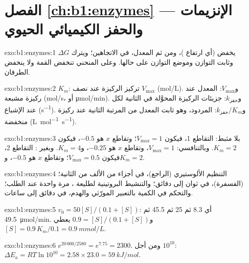 \section*{الفصل \ref{ch:b1:enzymes} --- الإنزيمات والحفز الكيميائي الحيوي}

\begin{solution}{exo:b1:enzymes:1}
يخفض  (أي ارتفاع )، ومن ثم المعدل، في
الاتجاهين؛ ويترك $\Delta G$ وثابت التوازن وموضع التوازن على حالها.
وعلى المنحني تنخفض القمة ولا ينخفض الطرفان.
\end{solution}

\begin{solution}{exo:b1:enzymes:2}
$K_m$: تركيز الركيزة عند نصف $V_{\max}$ (\unit{mol/L}).
و$V_{\max}$: المعدل عند ركيزة مشبعة (\unit{mol/s}، أو
\unit{\micro mol/min}). و$k_{\text{حفز}}$: جزيئات الركيزة المحوَّلة في
الثانية لكل  عند الإشباع (\unit{s^{-1}}).
و$k_{\text{حفز}}/K_m$: المردود، وهو ثابت المعدل من المرتبة الثانية عند
ركيزة منخفضة (\unit{L.mol^{-1}.s^{-1}}).
\end{solution}

\begin{solution}{exo:b1:enzymes:3}
بلا مثبط: التقاطع 1، فيكون $V_{\max} = 1$؛ وتقاطع $x$ هو $-0.5$،
فيكون $K_m = 2$. وبالتنافسي: $V_{\max} = 1$، وتقاطع $x$ هو $-0.25$،
و$K_m = 4$. وبغير : التقاطع 2، فيكون $V_{\max} = 0.5$؛ وتقاطع
$x$ هو $-0.5$، و$K_m = 2$.
\end{solution}

\begin{solution}{exo:b1:enzymes:4}
التنظيم الألوستيري (الراجع)، في أجزاء من الألف من الثانية؛  (الفسفرة)، في ثوان إلى دقائق؛ والتنشيط  البروتينية
لطليعة ، مرة واحدة عند الطلب؛ والتحكم في الكمية بالتعبير
المورّثي والهدم، في دقائق إلى ساعات.
\end{solution}

\begin{solution}{exo:b1:enzymes:5}
$v_0 = 50[S]/(0.1 + [S])$: أي 8.3 ثم 25 ثم 45.5 ثم
\qty{49.5}{\micro mol/min}.
و$0.9 = [S]/(0.1 + [S])$ يعطي $[S] = 0.9\,K_m/0.1 = \qty{0.9}{mmol/L}$.
\end{solution}

\begin{solution}{exo:b1:enzymes:6}
$e^{20\,000/2580} = e^{7.75} = 2300$. ومن أجل $10^{10}$:
$\Delta E_a =
RT\ln 10^{10} = 2.58\times 23.0 = \qty{59}{kJ/mol}$.
\end{solution}

